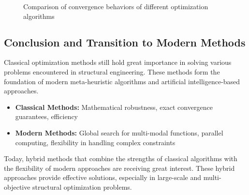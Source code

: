 \begin{figure}
\centering
{}
\caption{Comparison of convergence behaviors of different optimization algorithms}
\label{fig:convergence_comparison}
\end{figure}

\subsection{Conclusion and Transition to Modern Methods}

Classical optimization methods still hold great importance in solving various problems encountered in structural engineering. These methods form the foundation of modern meta-heuristic algorithms and artificial intelligence-based approaches.

\begin{tcolorbox}[title=Comparison of Classical and Modern Methods]
\begin{itemize}
    \item \textbf{Classical Methods:} Mathematical robustness, exact convergence guarantees, efficiency
    \item \textbf{Modern Methods:} Global search for multi-modal functions, parallel computing, flexibility in handling complex constraints
\end{itemize}
\end{tcolorbox}

Today, hybrid methods that combine the strengths of classical algorithms with the flexibility of modern approaches are receiving great interest. These hybrid approaches provide effective solutions, especially in large-scale and multi-objective structural optimization problems.
